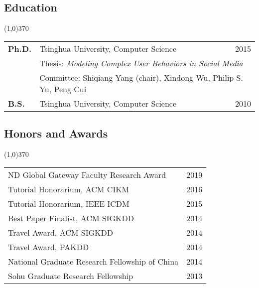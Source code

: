 \documentclass[10pt]{article}
\newcounter{list}
\begin{document}
\vspace{-0.2cm}
\subsection{\sc Education}
\vspace{-0.4cm} \line(1,0){370} \vspace{-0.1cm}

\begin{table}[h!]
\begin{tabular*}{12.7cm}{p{1.15cm}p{10.00cm}r}
\bf{Ph.D.}&Tsinghua University, Computer Science&2015\\
 &\multicolumn{2}{l}{\small Thesis: \emph{Modeling Complex User Behaviors in Social Media}}\\
 &\multicolumn{2}{l}{\small Committee: Shiqiang Yang (chair), Xindong Wu, Philip S. Yu, Peng Cui\vspace{0.2cm}}\\
\bf{B.S.}&Tsinghua University, Computer Science&2010\\

\end{tabular*}
\end{table}

\vspace{-0.6cm}
\subsection{\sc Honors and Awards}
\vspace{-0.4cm} \line(1,0){370} \vspace{-0.1cm}

\begin{table}[h!]
\begin{tabular*}{12.7cm}{p{11.65cm}r}
ND Global Gateway Faculty Research Award&2019 \\
Tutorial Honorarium, ACM CIKM&2016 \\
Tutorial Honorarium, IEEE ICDM&2015 \\
Best Paper Finalist, ACM SIGKDD&2014 \\
Travel Award, ACM SIGKDD&2014 \\
Travel Award, PAKDD&2014 \\
National Graduate Research Fellowship of China&2014 \\
Sohu Graduate Research Fellowship&2013 \\
\end{tabular*}
\end{table}
\end{document}
